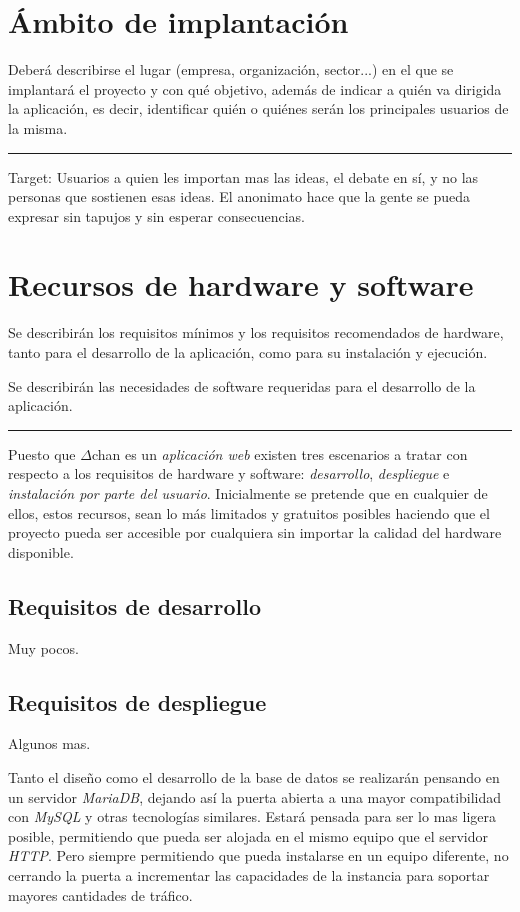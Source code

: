 \documentclass[12pt,a4paper,titlepage]{article}
\newcommand\projectname{$\Delta$chan}
\begin{document}
    \section{Ámbito de implantación}

    Deberá describirse el lugar (empresa, organización, sector...) en el que se implantará el proyecto y con qué objetivo, además de indicar a quién va dirigida la aplicación, es decir, identificar quién o quiénes serán los principales usuarios de la misma.

    \bigskip\hrule\bigskip

    Target: Usuarios a quien les importan mas las ideas, el debate en sí, y no las personas que sostienen esas ideas. El anonimato hace que la gente se pueda expresar sin tapujos y sin esperar consecuencias.

    \section{Recursos de hardware y software}

    Se describirán los requisitos mínimos y los requisitos recomendados de hardware, tanto para el desarrollo de la aplicación, como para su instalación y ejecución.

    Se describirán las necesidades de software requeridas para el desarrollo de la aplicación.

    \bigskip\hrule\bigskip

    Puesto que {\projectname} es un \emph{aplicación web} existen tres escenarios a tratar con respecto a los requisitos de hardware y software: \emph{desarrollo}, \emph{despliegue} e \emph{instalación por parte del usuario}. Inicialmente se pretende que en cualquier de ellos, estos recursos, sean lo más limitados y gratuitos posibles haciendo que el proyecto pueda ser accesible por cualquiera sin importar la calidad del hardware disponible.

    \subsection{Requisitos de desarrollo}

    Muy pocos.

    \subsection{Requisitos de despliegue}

    Algunos mas.

    Tanto el diseño como el desarrollo de la base de datos se realizarán pensando en un servidor \emph{MariaDB}, dejando así la puerta abierta a una mayor compatibilidad con \emph{MySQL} y otras tecnologías similares. Estará pensada para ser lo mas ligera posible, permitiendo que pueda ser alojada en el mismo equipo que el servidor \emph{HTTP}. Pero siempre permitiendo que pueda instalarse en un equipo diferente, no cerrando la puerta a incrementar las capacidades de la instancia para soportar mayores cantidades de tráfico.
\end{document}
